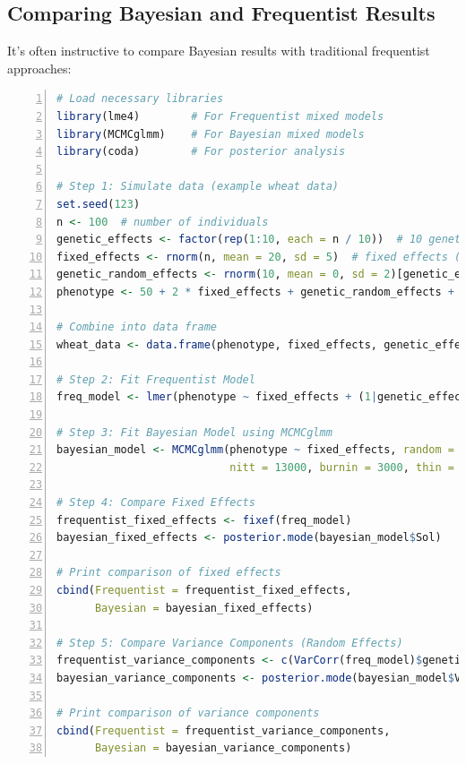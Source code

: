 \documentclass[12pt,a4paper]{article}
\begin{document}
\subsection{Comparing Bayesian and Frequentist Results}

It's often instructive to compare Bayesian results with traditional frequentist approaches:

\begin{lstlisting}[language=R, 
                   caption=Comparing Bayesian and Frequentist Genetic Analyses,
                   basicstyle=\ttfamily\footnotesize,
                   keywordstyle=\color{blue},
                   stringstyle=\color{red},
                   commentstyle=\color{green!60!black},
                   numbers=left,
                   numberstyle=\tiny\color{gray},
                   frame=single,
                   breaklines=true,
                   linewidth=0.95\textwidth,
                   columns=flexible,
                   xleftmargin=0.05\textwidth,
                   xrightmargin=0.05\textwidth]
# Load necessary libraries
library(lme4)        # For Frequentist mixed models
library(MCMCglmm)    # For Bayesian mixed models
library(coda)        # For posterior analysis

# Step 1: Simulate data (example wheat data)
set.seed(123)
n <- 100  # number of individuals
genetic_effects <- factor(rep(1:10, each = n / 10))  # 10 genetic groups
fixed_effects <- rnorm(n, mean = 20, sd = 5)  # fixed effects (e.g., environmental)
genetic_random_effects <- rnorm(10, mean = 0, sd = 2)[genetic_effects]  # random genetic effects
phenotype <- 50 + 2 * fixed_effects + genetic_random_effects + rnorm(n, sd = 3)  # phenotype

# Combine into data frame
wheat_data <- data.frame(phenotype, fixed_effects, genetic_effects)

# Step 2: Fit Frequentist Model
freq_model <- lmer(phenotype ~ fixed_effects + (1|genetic_effects), data = wheat_data)

# Step 3: Fit Bayesian Model using MCMCglmm
bayesian_model <- MCMCglmm(phenotype ~ fixed_effects, random = ~ genetic_effects, data = wheat_data, 
                           nitt = 13000, burnin = 3000, thin = 10)

# Step 4: Compare Fixed Effects
frequentist_fixed_effects <- fixef(freq_model)
bayesian_fixed_effects <- posterior.mode(bayesian_model$Sol)

# Print comparison of fixed effects
cbind(Frequentist = frequentist_fixed_effects,
      Bayesian = bayesian_fixed_effects)

# Step 5: Compare Variance Components (Random Effects)
frequentist_variance_components <- c(VarCorr(freq_model)$genetic_effects[1], sigma(freq_model)^2)
bayesian_variance_components <- posterior.mode(bayesian_model$VCV)

# Print comparison of variance components
cbind(Frequentist = frequentist_variance_components,
      Bayesian = bayesian_variance_components)

\end{lstlisting}
\end{document}
